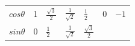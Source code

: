 {{\begin{center}
\begin{tabular}[t]{|l|l|l|l|l|l|l|}
                $cos\theta $
               &
        1 &
                $\frac{\sqrt{3}}{2}$
               &
                $\frac{1}{\sqrt{2}}$
               &
                $\frac{1}{2}$
               &
        0 &
                $-1$
     \tabularnewline\cline{1-1}\cline{2-2}\cline{3-3}\cline{4-4}\cline{5-5}\cline{6-6}\cline{7-7}
                $sin\theta $
               &
        0 &
                $\frac{1}{2}$
               &
                $\frac{1}{\sqrt{2}}$
               &
                $\frac{\sqrt{3}}{2}$
               &

\end{tabular}
\end{center}}}
